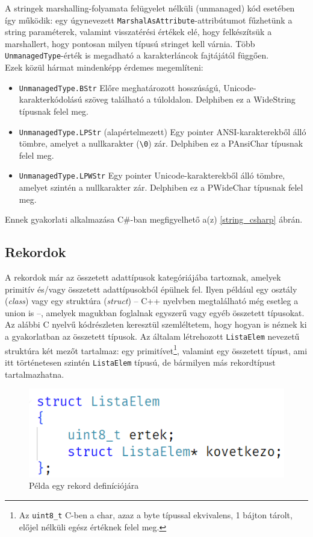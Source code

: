 \documentclass[tocnopagenum]{thesis-ekf}
\begin{document}
	A stringek marshalling-folyamata felügyelet nélküli (unmanaged) kód esetében így működik: egy úgynevezett \verb*|MarshalAsAttribute|-attribútumot fűzhetünk a string paraméterek, valamint visszatérési értékek elé, hogy felkészítsük a marshallert, hogy pontosan milyen típusú stringet kell várnia. Több \verb*|UnmanagedType|-érték is megadható a karakterláncok fajtájától függően.\cite{marshalling_strings}\\
	Ezek közül hármat mindenképp érdemes megemlíteni:
	\begin{itemize}
		\item \verb*|UnmanagedType.BStr| Előre meghatározott hosszúságú, Unicode-karakterkódolású szöveg található a túloldalon. Delphiben ez a WideString típusnak felel meg.
		\item \verb*|UnmanagedType.LPStr| (alapértelmezett) Egy pointer ANSI-karakterekből álló tömbre, amelyet a nullkarakter (\verb*|\0|) zár. Delphiben ez a PAnsiChar típusnak felel meg. 
		\item \verb*|UnmanagedType.LPWStr| Egy pointer Unicode-karakterekből álló tömbre, amelyet szintén a nullkarakter zár. Delphiben ez a PWideChar típusnak felel meg.
	\end{itemize}
	Ennek gyakorlati alkalmazása C\#-ban megfigyelhető a(z) \ref{string_csharp} ábrán.
	\subsection{Rekordok}
	A rekordok már az összetett adattípusok kategóriájába tartoznak, amelyek primitív és/vagy összetett adattípusokból épülnek fel. Ilyen például egy osztály (\textit{class}) vagy egy struktúra (\textit{struct}) -- C++ nyelvben megtalálható még esetleg a union is --, amelyek magukban foglalnak egyszerű vagy egyéb összetett típusokat.
	Az alábbi C nyelvű kódrészleten keresztül szemléltetem, hogy hogyan is néznek ki a gyakorlatban az összetett típusok. Az általam létrehozott \verb*|ListaElem| nevezetű struktúra két mezőt tartalmaz: egy primitívet\footnote{Az \verb*|uint8_t| C-ben a char, azaz a byte típussal ekvivalens, 1 bájton tárolt, előjel nélküli egész értéknek felel meg.}, valamint egy összetett típust, ami itt történetesen szintén \verb*|ListaElem| típusú, de bármilyen más rekordtípust tartalmazhatna.
	\begin{figure}[H]
		\centering
		\includegraphics[scale=0.65]{linkedlist_struct}
		\caption{Példa egy rekord definíciójára}
		\label{fig:linkedlist_struct}
	\end{figure}
	
\end{document}

